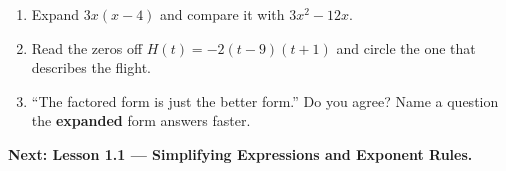 \documentclass[aspectratio=169, 11pt]{beamer}
\begin{document}
\begin{frame}[t, plain]
  \begin{enumerate}
    \setlength{\itemsep}{0.35cm}
    \item Expand $3x(x-4)$ and compare it with $3x^2-12x$.
    \item Read the zeros off $H(t)=-2(t-9)(t+1)$ and circle the one that describes the flight.
    \item ``The factored form is just the better form.'' Do you agree? Name a question the
          \textbf{expanded} form answers faster.
  \end{enumerate}
  \vspace{0.3cm}
  {\color{royal}\bfseries Next: Lesson 1.1 --- Simplifying Expressions and Exponent Rules.}
\end{frame}
\end{document}
